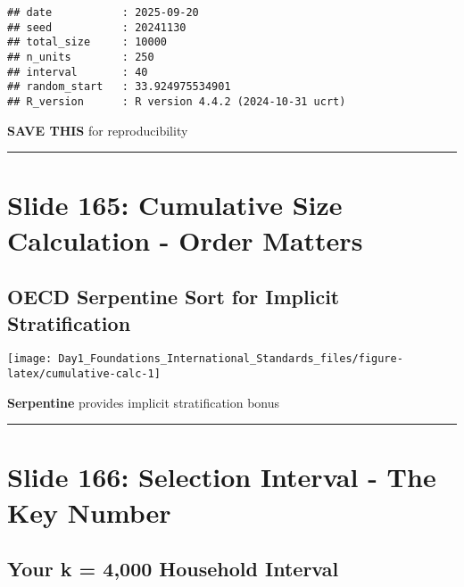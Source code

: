 \documentclass[
]{article}
\begin{document}
\begin{verbatim}
## date           : 2025-09-20
## seed           : 20241130
## total_size     : 10000
## n_units        : 250
## interval       : 40
## random_start   : 33.924975534901
## R_version      : R version 4.4.2 (2024-10-31 ucrt)
\end{verbatim}

\textbf{SAVE THIS} for reproducibility

\begin{center}\rule{0.5\linewidth}{0.5pt}\end{center}

\section{Slide 165: Cumulative Size Calculation - Order
Matters}\label{slide-165-cumulative-size-calculation---order-matters}

\subsection{OECD Serpentine Sort for Implicit
Stratification}\label{oecd-serpentine-sort-for-implicit-stratification}

\texttt{[image: Day1\_Foundations\_International\_Standards\_files/figure-latex/cumulative-calc-1]}

\textbf{Serpentine} provides implicit stratification bonus

\begin{center}\rule{0.5\linewidth}{0.5pt}\end{center}

\section{Slide 166: Selection Interval - The Key
Number}\label{slide-166-selection-interval---the-key-number}

\subsection{Your k = 4,000 Household
Interval}\label{your-k-4000-household-interval}
\end{document}
